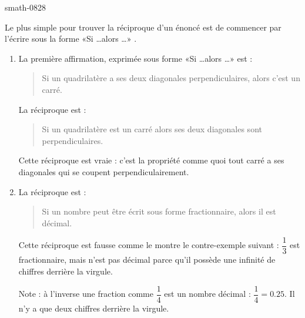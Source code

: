 
\begin{corrige}{smath-0828}

    Le plus simple pour trouver la réciproque d'un énoncé est de commencer par l'écrire sous la forme «Si \ldots alors \ldots» .
    \begin{enumerate}
        \item
            La première affirmation, exprimée sous forme «Si \ldots alors \ldots» est :
            \begin{quote}
                Si un quadrilatère a ses deux diagonales perpendiculaires, alors c'est un carré.
            \end{quote}
            La réciproque est :
            \begin{quote}
                Si un quadrilatère est un carré alors ses deux diagonales sont perpendiculaires.
            \end{quote}
            Cette réciproque est vraie : c'est la propriété comme quoi tout carré a ses diagonales qui se coupent perpendiculairement.
        \item
            La réciproque est :
            \begin{quote}
                Si un nombre peut être écrit sous forme fractionnaire, alors il est décimal.
            \end{quote}
            Cette réciproque est fausse comme le montre le contre-exemple suivant : \( \dfrac{1}{ 3 }\) est fractionnaire, mais n'est pas décimal parce qu'il possède une infinité de chiffres derrière la virgule.

            Note : à l'inverse une fraction comme \( \dfrac{ 1 }{ 4 }\) est un nombre décimal : \( \dfrac{ 1 }{ 4 }=0.25\). Il n'y a que deux chiffres derrière la virgule.
    \end{enumerate}

\end{corrige}

